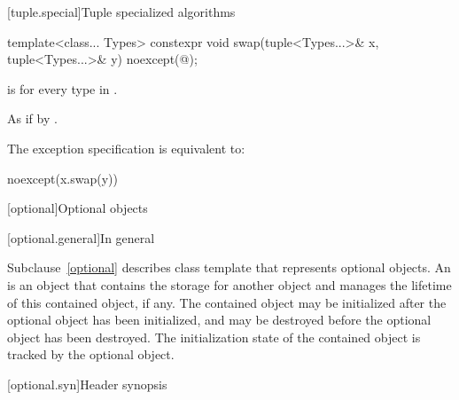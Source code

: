 [tuple.special]{Tuple specialized algorithms}

%
\begin{itemdecl}
template<class... Types>
  constexpr void swap(tuple<Types...>& x, tuple<Types...>& y) noexcept(@\seebelow@);
\end{itemdecl}

\begin{itemdescr}
\pnum
\constraints
{} is 
for every type  in .

\pnum
\effects
As if by .

\pnum
\remarks
The exception specification is equivalent to:

\begin{codeblock}
noexcept(x.swap(y))
\end{codeblock}
\end{itemdescr}

[optional]{Optional objects}

[optional.general]{In general}

\pnum
Subclause~\ref{optional} describes class template  that represents
optional objects.
An  is an
object that contains the storage for another object and manages the lifetime of
this contained object, if any. The contained object may be initialized after
the optional object has been initialized, and may be destroyed before the
optional object has been destroyed. The initialization state of the contained
object is tracked by the optional object.

[optional.syn]{Header  synopsis}

